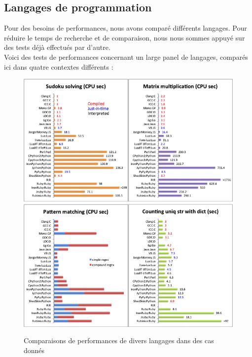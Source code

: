 \documentclass[a4paper]{article}
\newcommand{\alinea}{\hspace*{0.5cm}}
\begin{document}
      \subsection{Langages de programmation}
        \alinea Pour des besoins de performances, nous avons comparé différents langages. Pour réduire le temps de recherche et de comparaison, nous nous sommes appuyé sur des tests déjà effectués par d'autre.\\
        \alinea Voici des tests de performances concernant un large panel de langages, comparés ici dans quatre contextes différents :\\
        \begin{figure}
          \begin{center}
            \includegraphics[scale=0.5]{img/AnalyseLangage1.png}
            \includegraphics[scale=0.5]{img/AnalyseLangage2.png} 
          \end{center}
          \label{DiagAnalyse}
          \caption{Comparaisons de performances de divers langages dans des cas donnés}
        \end{figure}
\end{document}
